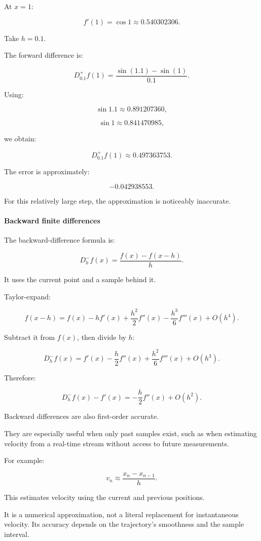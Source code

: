 At \(x=1\):

\[
f'(1)=\cos1\approx0.540302306.
\]

Take \(h=0.1\).

The forward difference is:

\[
D_{0.1}^+f(1)= \frac{\sin(1.1)-\sin(1)}{0.1}.
\]

Using:

\[
\sin1.1\approx0.891207360,
\]

\[
\sin1\approx0.841470985,
\]

we obtain:

\[
\boxed{ D_{0.1}^+f(1)\approx0.497363753 }.
\]

The error is approximately:

\[
-0.042938553.
\]

For this relatively large step, the approximation is noticeably inaccurate.

\paragraph{Backward finite differences}\label{02-foundations-ii-ch025-backward-finite-differences}

The backward-difference formula is:

\[
\boxed{ D_h^-f(x)= \frac{f(x)-f(x-h)}h }.
\]

It uses the current point and a sample behind it.

Taylor-expand:

\[
f(x-h) = f(x)-hf'(x)+ \frac{h^2}{2}f''(x)- \frac{h^3}{6}f'''(x)+O(h^4).
\]

Subtract it from \(f(x)\), then divide by \(h\):

\[
D_h^-f(x) = f'(x)- \frac h2f''(x)+ \frac{h^2}{6}f'''(x)+O(h^3).
\]

Therefore:

\[
\boxed{ D_h^-f(x)-f'(x) = -\frac h2f''(x)+O(h^2) }.
\]

Backward differences are also first-order accurate.

They are especially useful when only past samples exist, such as when estimating velocity from a real-time stream without access to future measurements.

For example:

\[
v_n\approx\frac{x_n-x_{n-1}}h.
\]

This estimates velocity using the current and previous positions.

It is a numerical approximation, not a literal replacement for instantaneous velocity. Its accuracy depends on the trajectory's smoothness and the sample interval.

